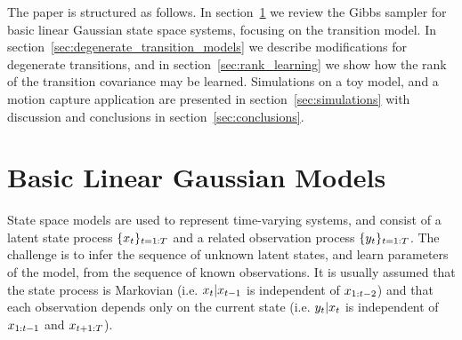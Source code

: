 \documentclass[journal,10pt]{IEEEtran}
\begin{document}

The paper is structured as follows. In section~\ref{sec:linear_gaussian_models} we review the Gibbs sampler for basic linear Gaussian state space systems, focusing on the transition model. In section~\ref{sec:degenerate_transition_models} we describe modifications for degenerate transitions, and in section~\ref{sec:rank_learning} we show how the rank of the transition covariance may be learned. Simulations on a toy model, and a motion capture application are presented in section~\ref{sec:simulations} with discussion and conclusions in section~\ref{sec:conclusions}.





\section{Basic Linear Gaussian Models} \label{sec:linear_gaussian_models}
State space models are used to represent time-varying systems, and consist of a latent state process $\{x_{t}\}_{t=1:T}$ and a related observation process $\{y_{t}\}_{t=1:T}$. The challenge is to infer the sequence of unknown latent states, and learn parameters of the model, from the sequence of known observations. It is usually assumed that the state process is Markovian (i.e. $x_{t}|x_{t-1}$ is independent of $x_{1:t-2}$) and that each observation depends only on the current state (i.e. $y_{t}|x_{t}$ is independent of $x_{1:t-1}$ and $x_{t+1:T}$).
\end{document}
